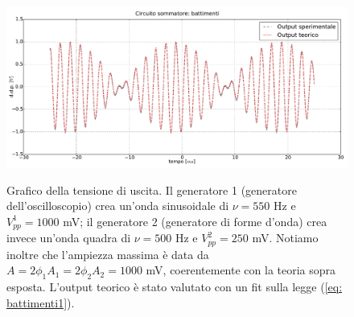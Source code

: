 \begin{figure}[ht]
 \centering
   {\includegraphics[width=17.5cm]{../E01/latex/battimenti_ideali.pdf}}
 \caption{Grafico della tensione di uscita. Il generatore 1 (generatore dell'oscilloscopio) crea un'onda sinusoidale di $\nu=550$ \si{\hertz} e $V^1_{pp}=1000$ \si{\milli\volt}; il generatore 2 (generatore di forme d'onda) crea invece un'onda quadra di $\nu=500$ \si{\hertz} e $V^2_{pp}=250$ \si{\milli\volt}. Notiamo inoltre che l'ampiezza massima è data da $A = 2 \phi_1 A_1 = 2 \phi_2 A_2 = 1000$ \si{\milli\volt}, coerentemente con la teoria sopra esposta. L'output teorico è stato valutato con un fit sulla legge (\ref{eq: battimenti1}).}
 \label{gr:battimenti}
\end{figure}